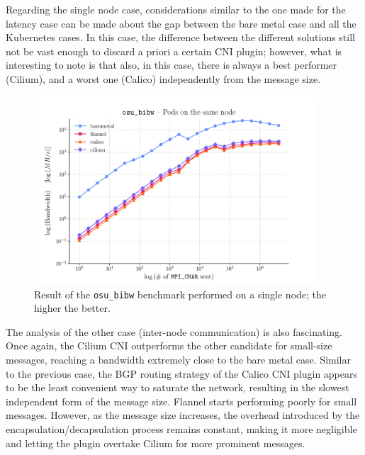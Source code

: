 Regarding the single node case, considerations similar to the one made for the
latency case can be made about the gap between the bare metal case and all the
Kubernetes cases.
In this case, the difference between the different solutions still not be vast
enough to discard a priori a certain CNI plugin; however, what is interesting to
note is that also, in this case, there is always a best performer (Cilium), and
a worst one (Calico) independently from the message size.

\begin{figure}
  \centering
  \includegraphics[width=0.94\textwidth]{img/chpt3/bibw-1-node}
  \caption{Result of the \texttt{osu\_bibw} benchmark performed on a single
    node; the higher the better.}
  \label{fig:bibw-1-node}
\end{figure}

The analysis of the other case (inter-node communication) is also fascinating.
Once again, the Cilium CNI outperforms the other candidate for small-size
messages, reaching a bandwidth extremely close to the bare metal case.
Similar to the previous case, the BGP routing strategy of the Calico CNI plugin
appears to be the least convenient way to saturate the network, resulting in the
slowest independent form of the message size.
Flannel starts performing poorly for small messages. However, as the message
size increases, the overhead introduced by the encapsulation/decapsulation
process remains constant, making it more negligible and letting the plugin
overtake Cilium for more prominent messages.

